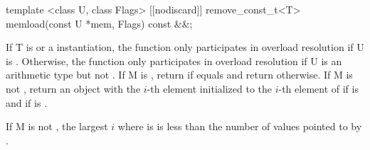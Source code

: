 \begin{itemdecl}
template <class U, class Flags>
[[nodiscard]] remove_const_t<T> memload(const U *mem, Flags) const &&;
\end{itemdecl}
\begin{itemdescr}
  \pnum\remarks If \type T is \bool or a \mask instantiation, the function only participates in overload resolution if \type U is \bool.
  Otherwise, the function only participates in overload resolution if \type U is an arithmetic type but not \bool.
  \pnum\returns If \type M is \bool, return  if  equals \true and return  otherwise.
  If \type M is not \bool, return an object with the $i$-th element initialized to the $i$-th element of  if  is \false and  if  is \true \foralli[M::].

  \pnum\requires If \type M is not \bool, the largest $i$ where  is \true is less than the number of values pointed to by .
\end{itemdescr}

